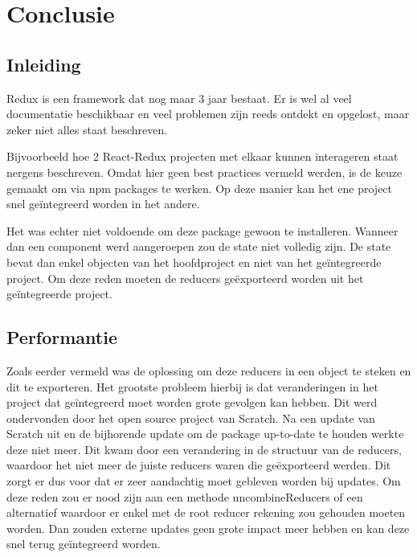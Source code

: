
\chapter{Conclusie}
\label{ch:conclusie}


\section{Inleiding}
Redux is een framework dat nog maar 3 jaar bestaat. Er is wel al veel documentatie beschikbaar en veel problemen zijn reeds ontdekt en opgelost, maar zeker niet alles staat beschreven. 

Bijvoorbeeld hoe 2 React-Redux projecten met elkaar kunnen interageren staat nergens beschreven. Omdat hier geen best practices vermeld werden, is de keuze gemaakt om via npm packages te werken. Op deze manier kan het ene project snel geïntegreerd worden in het andere. 

Het was echter niet voldoende om deze package gewoon te installeren. Wanneer dan een component werd aangeroepen zou de state niet volledig zijn. De state bevat dan enkel objecten van het hoofdproject en niet van het geïntegreerde project. Om deze reden moeten de reducers geëxporteerd worden uit het geïntegreerde project. 

\section{Performantie}
Zoals eerder vermeld was de oplossing om deze reducers in een object te steken en dit te exporteren. Het grootste probleem hierbij is dat veranderingen in het project dat geïntegreerd moet worden grote gevolgen kan hebben. Dit werd ondervonden door het open source project van Scratch. Na een update van Scratch uit en de bijhorende update om de package up-to-date te houden werkte deze niet meer. Dit kwam door een verandering in de structuur van de reducers, waardoor het niet meer de juiste reducers waren die geëxporteerd werden. Dit zorgt er dus voor dat er zeer aandachtig moet gebleven worden bij updates. Om deze reden zou er nood zijn aan een methode uncombineReducers of een alternatief waardoor er enkel met de root reducer rekening zou gehouden moeten worden. Dan zouden externe updates geen grote impact meer hebben en kan deze snel terug geïntegreerd worden.

